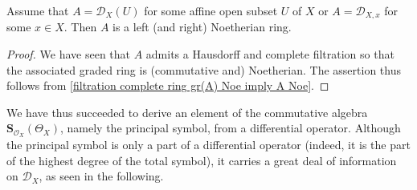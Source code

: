 \begin{proposition}\label{D-module section ring of D_X is Noe}
Assume that $A=\mathscr{D}_X(U)$ for some affine open subset $U$ of $X$ or $A=\mathscr{D}_{X,x}$ for some $x\in X$. Then $A$ is a left (and right) Noetherian ring.
\end{proposition}
\begin{proof}
We have seen that $A$ admits a Hausdorff and complete filtration so that the associated graded ring is (commutative and) Noetherian. The assertion thus follows from \cref{filtration complete ring gr(A) Noe imply A Noe}.
\end{proof}

We have thus succeeded to derive an element of the commutative algebra $\bm{S}_{\mathscr{O}_X}(\Theta_X)$, namely the principal symbol, from a differential operator. Although the principal symbol is only a part of a differential operator (indeed, it is the part of the highest degree of the total symbol), it carries a great deal of information on $\mathscr{D}_X$, as seen in the following.\par

